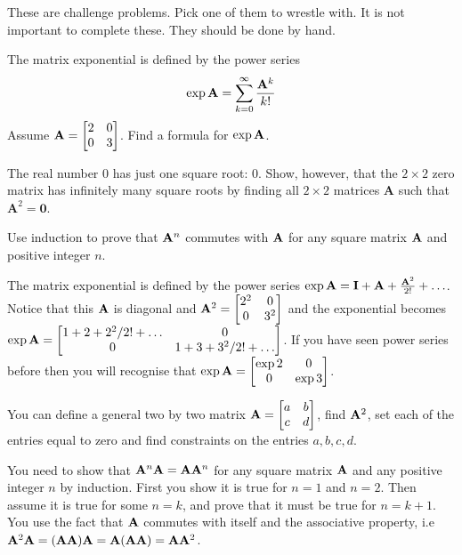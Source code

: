\begin{prob}
These are challenge problems. Pick one of them to wrestle with. It is not important to complete these. They should be done by hand.
\be
\item The matrix exponential is defined by the power series
\[ \exp{\mathbf{A}} = \sum_{k=0}^{\infty} \frac{\mathbf{A}^k}{k!} \]
Assume $\mathbf{A} = \begin{bmatrix} 2 & 0 \\ 0 & 3\end{bmatrix}$. Find a formula for $\exp{\mathbf{A}}$. 
\item The real number $0$ has just one square root: $0$. Show, however, that the $2 \times 2$ zero matrix has infinitely many square roots by finding all $2 \times 2$ matrices $\mathbf{A}$ such that $\mathbf{A}^2 = \mathbf{0}$.  
\item Use induction to prove that $\mathbf{A}^n$ commutes with $\mathbf{A}$ for any square matrix $\mathbf{A}$ and positive integer $n$.
\ee
\end{prob}
\begin{sol}
\be
\item The matrix exponential is defined by the power series $\exp{\mathbf{A}} = \mathbf{I} + \mathbf{A} + \frac{\mathbf{A}^2}{2!} + \ldots$. Notice that this $\mathbf{A}$ is diagonal and $\mathbf{A}^2 = \begin{bmatrix} 2^2 & 0 \\ 0 & 3^2\end{bmatrix}$ and the exponential becomes $\exp{\mathbf{A}} = \begin{bmatrix} 1 + 2 + 2^2/2! + \ldots & 0 \\ 0 & 1 + 3 + 3^2/2! + \ldots\end{bmatrix}$. If you have seen power series before then you will recognise that $\exp{\mathbf{A}} = \begin{bmatrix} \exp{2} & 0 \\ 0 & \exp{3}\end{bmatrix}$.
\item You can define a general two by two matrix $\mathbf{A} = \begin{bmatrix} a & b \\ c & d\end{bmatrix}$, find $\mathbf{A}^2$, set each of the entries equal to zero and find constraints on the entries $a,b,c,d$.
\item You need to show that $\mathbf{A}^n \mathbf{A} = \mathbf{A} \mathbf{A}^n$ for any square matrix $\mathbf{A}$ and any positive integer $n$ by induction. First you show it is true for $n=1$ and $n=2$. Then assume it is true for some $n=k$, and prove that it must be true for $n=k+1$. You use the fact that $\mathbf{A}$ commutes with itself and the associative property, i.e $ \mathbf{A}^2 \mathbf{A} = (\mathbf{A} \mathbf{A}) \mathbf{A} = \mathbf{A} (\mathbf{A} \mathbf{A}) = \mathbf{A} \mathbf{A}^2$.
\ee
\end{sol}



